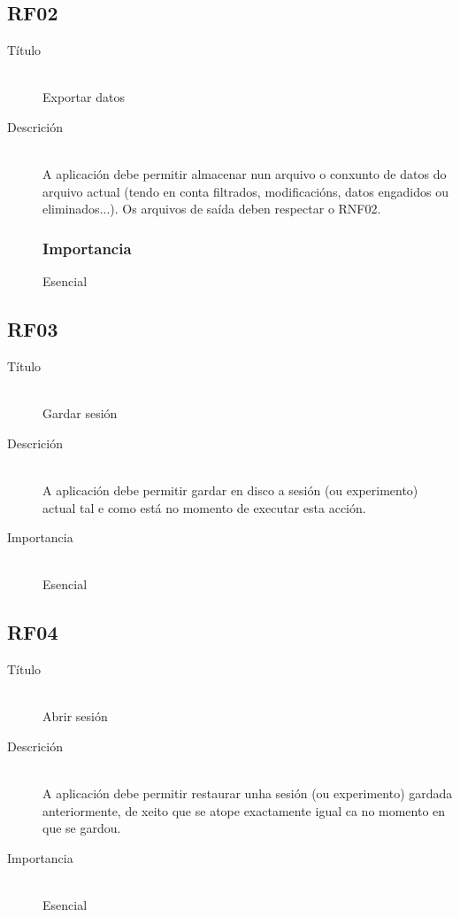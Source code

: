 \subsection*{RF02}
\begin{description}
\item[Título] \hfill \\
Exportar datos
\item[Descrición] \hfill \\
A aplicación debe permitir almacenar nun arquivo o conxunto de datos do arquivo actual (tendo en conta filtrados, modificacións, datos engadidos ou eliminados...). Os arquivos de saída deben respectar o RNF02.
\subsubsection{Importancia}
Esencial
\end{description}

\subsection*{RF03}
\begin{description}
\item[Título] \hfill \\
Gardar sesión
\item[Descrición] \hfill \\
A aplicación debe permitir gardar en disco a sesión (ou experimento) actual tal e como está no momento de executar esta acción.
\item[Importancia] \hfill \\
Esencial
\end{description}

\subsection*{RF04}
\begin{description}
\item[Título] \hfill \\
Abrir sesión
\item[Descrición] \hfill \\
A aplicación debe permitir restaurar unha sesión (ou experimento) gardada anteriormente, de xeito que se atope exactamente igual ca no momento en que se gardou.
\item[Importancia] \hfill \\
Esencial
\end{description}

